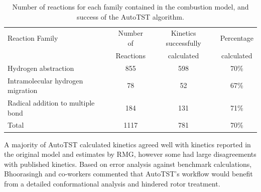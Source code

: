 \documentclass[preprint, 11pt]{elsarticle} %
\begin{document}
\begin{table}[h!]
\label{t:atst_r}
\small
\caption{\label{table:ModelRxns} Number of reactions for each family contained in the combustion model, and success of the AutoTST algorithm.}
\centering
\begin{tabular*}{\linewidth}{@{\extracolsep{\fill}}lccc}
\hline\rule{0pt}{2.6ex}%
Reaction Family & Number of  & Kinetics successfully & Percentage \\
  & Reactions  & calculated & calculated\\
\hline\rule{0pt}{2.6ex}%
Hydrogen abstraction & 855 & 598 & 70\% \\
Intramolecular hydrogen migration & 78 & 52 & 67\% \\
Radical addition to multiple bond & 184 & 131 & 71\% \\
\hline\rule{0pt}{2.6ex}%
Total & 1117 & 781 & 70\%\\
\hline
\end{tabular*}
\end{table}

A majority of AutoTST calculated kinetics agreed well with kinetics reported in the original model and estimates by RMG, however some had large disagreements with published kinetics. 
Based on error analysis against benchmark calculations, Bhoorasingh and co-workers commented that AutoTST's workflow would benefit from a detailed conformational analysis and hindered rotor treatment. 
\end{document}
